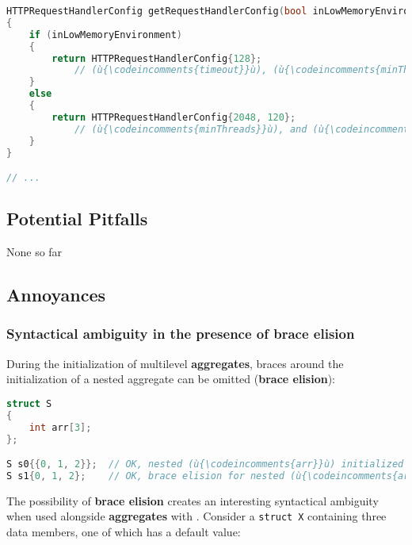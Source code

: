 \begin{lstlisting}[language=C++]
HTTPRequestHandlerConfig getRequestHandlerConfig(bool inLowMemoryEnvironment)
{
    if (inLowMemoryEnvironment)
    {
        return HTTPRequestHandlerConfig{128};
            // (ù{\codeincomments{timeout}}ù), (ù{\codeincomments{minThreads}}ù), and (ù{\codeincomments{maxThreads}}ù) have their default value.
    }
    else
    {
        return HTTPRequestHandlerConfig{2048, 120};
            // (ù{\codeincomments{minThreads}}ù), and (ù{\codeincomments{maxThreads}}ù) have their default value.
    }
}

// ...
\end{lstlisting}


\subsection[Potential Pitfalls]{Potential Pitfalls}\label{potential-pitfalls}

None so far

\subsection[Annoyances]{Annoyances}\label{annoyances}

\subsubsection[Syntactical ambiguity in the presence of \textbf{brace elision}]{Syntactical ambiguity in the presence of \textbf{brace elision}}\label{syntactical-ambiguity-in-the-presence-of-brace-elision}

During the initialization of multilevel \textbf{aggregates}, braces
around the initialization of a nested aggregate can be omitted
(\textbf{brace elision}):

\begin{lstlisting}[language=C++]
struct S
{
    int arr[3];
};

S s0{{0, 1, 2}};  // OK, nested (ù{\codeincomments{arr}}ù) initialized explicitly
S s1{0, 1, 2};    // OK, brace elision for nested (ù{\codeincomments{arr}}ù)
\end{lstlisting}

\noindent The possibility of \textbf{brace elision} creates an interesting
syntactical ambiguity when used alongside \textbf{aggregates} with
. Consider a
\texttt{struct}~\texttt{X} containing three data members, one of which
has a default value:

